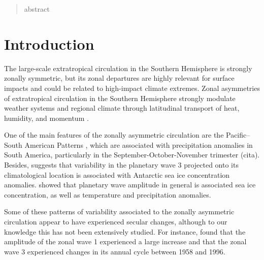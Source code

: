 \documentclass[smallextended]{svjour3}       %
\begin{document}
\date{Received: date / Accepted: date}


\maketitle

\begin{abstract}
abstract
\\
\keywords{
         \and
    }


\end{abstract}


\def\spacingset#1{\renewcommand{\baselinestretch}%
{#1}\small\normalsize} \spacingset{1}


\hypertarget{introduction}{%
\section{Introduction}\label{introduction}}

The large-scale extratropical circulation in the Southern Hemisphere is strongly zonally symmetric, but its zonal departures are highly relevant for surface impacts and could be related to high-impact climate extremes.
Zonal asymmetries of extratropical circulation in the Southern Hemisphere strongly modulate weather systems and regional climate through latitudinal transport of heat, humidity, and momentum \citep{trenberth1980}.

One of the main features of the zonally asymmetric circulation are the Pacific--South American Patterns \citep{mo2001}, which are associated with precipitation anomalies in South America, particularly in the September-October-November trimester (cita).
Besides, \citet{raphael2007} suggests that variability in the planetary wave 3 projected onto its climatological location is associated with Antarctic sea ice concentration anomalies.
\citet{irving2015} showed that planetary wave amplitude in general is associated sea ice concentration, as well as temperature and precipitation anomalies.

Some of these patterns of variability associated to the zonally asymmetric circulation appear to have experienced secular changes, although to our knowledge this has not been extensively studied.
For instance, \citet{raphael2003} found that the amplitude of the zonal wave 1 experienced a large increase and that the zonal wave 3 experienced changes in its annual cycle between 1958 and 1996.
\end{document}
